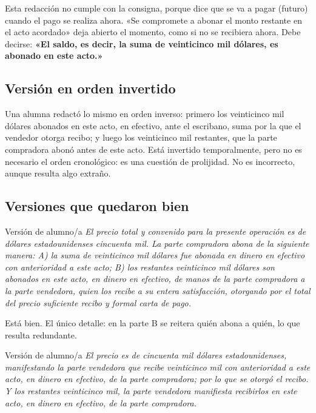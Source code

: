 \documentclass[12pt,oneside]{book}
\begin{document}
Esta redacción no cumple con la consigna, porque dice que se va a pagar (futuro) cuando el pago se realiza ahora. «Se compromete a abonar el monto restante en el acto acordado» deja abierto el momento, como si no se recibiera ahora. Debe decirse: \textbf{«El saldo, es decir, la suma de veinticinco mil dólares, es abonado en este acto.»}

\subsection{Versión en orden invertido}

Una alumna redactó lo mismo en orden inverso: primero los veinticinco mil dólares abonados en este acto, en efectivo, ante el escribano, suma por la que el vendedor otorga recibo; y luego los veinticinco mil restantes, que la parte compradora abonó antes de este acto. Está invertido temporalmente, pero no es necesario el orden cronológico: es una cuestión de prolijidad. No es incorrecto, aunque resulta algo extraño.

\subsection{Versiones que quedaron bien}

\begin{example}{Versión de alumno/a}
\textit{El precio total y convenido para la presente operación es de dólares estadounidenses cincuenta mil. La parte compradora abona de la siguiente manera: A) la suma de veinticinco mil dólares fue abonada en dinero en efectivo con anterioridad a este acto; B) los restantes veinticinco mil dólares son abonados en este acto, en dinero en efectivo, de manos de la parte compradora a la parte vendedora, quien los recibe a su entera satisfacción, otorgando por el total del precio suficiente recibo y formal carta de pago.}
\end{example}

Está bien. El único detalle: en la parte B se reitera quién abona a quién, lo que resulta redundante.

\begin{example}{Versión de alumno/a}
\textit{El precio es de cincuenta mil dólares estadounidenses, manifestando la parte vendedora que recibe veinticinco mil con anterioridad a este acto, en dinero en efectivo, de la parte compradora; por lo que se otorgó el recibo. Y los restantes veinticinco mil, la parte vendedora manifiesta recibirlos en este acto, en dinero en efectivo, de la parte compradora.}
\end{example}
\end{document}
